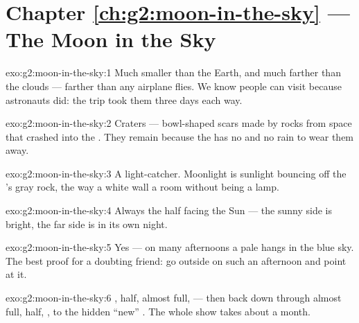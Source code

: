 \section*{Chapter \ref{ch:g2:moon-in-the-sky} --- The Moon in the Sky}

\begin{solution}{exo:g2:moon-in-the-sky:1}
Much smaller than the Earth, and much farther than the clouds ---
farther than any airplane flies. We know people can visit because
astronauts did: the trip took them three days each way.
\end{solution}

\begin{solution}{exo:g2:moon-in-the-sky:2}
Craters --- bowl-shaped scars made by rocks from space that crashed
into the . They remain because the  has no  and no rain
to wear them away.
\end{solution}

\begin{solution}{exo:g2:moon-in-the-sky:3}
A light-catcher. Moonlight is sunlight bouncing off the 's gray
rock, the way a white wall  a room without being a lamp.
\end{solution}

\begin{solution}{exo:g2:moon-in-the-sky:4}
Always the half facing the Sun --- the sunny side is bright, the far
side is in its own night.
\end{solution}

\begin{solution}{exo:g2:moon-in-the-sky:5}
Yes --- on many afternoons a pale  hangs in the blue sky. The
best proof for a doubting friend: go outside on such an afternoon
and point at it.
\end{solution}

\begin{solution}{exo:g2:moon-in-the-sky:6}
, half, almost full,  --- then back down through
almost full, half, , to the hidden ``new'' . The whole
show takes about a month.
\end{solution}

